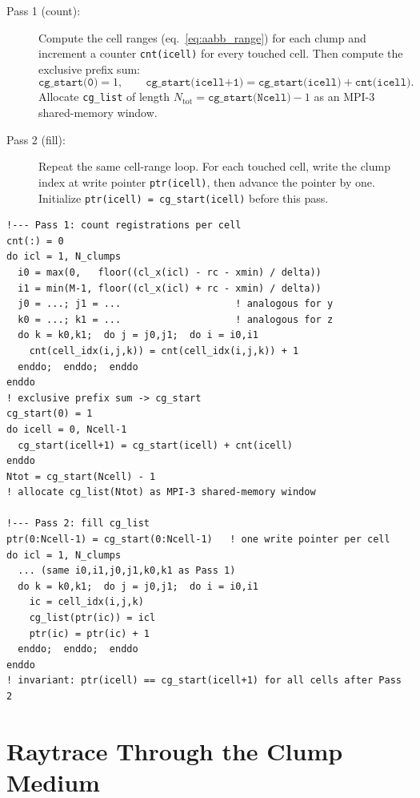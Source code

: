\documentclass[english,a4paper]{my_memo}
\begin{document}
\begin{sloppypar}
\begin{description}
  \item[Pass 1 (count):] Compute the cell ranges (eq.~\ref{eq:aabb_range})
  for each clump and increment a counter \texttt{cnt(icell)} for every
  touched cell.  Then compute the exclusive prefix sum:
  \[
    \texttt{cg\_start(0)} = 1, \qquad
    \texttt{cg\_start(icell+1)} = \texttt{cg\_start(icell)} + \texttt{cnt(icell)}.
  \]
  Allocate \texttt{cg\_list} of length
  $N_\mathrm{tot} = \texttt{cg\_start(Ncell)} - 1$ as an MPI-3
  shared-memory window.

  \item[Pass 2 (fill):] Repeat the same cell-range loop.  For each touched
  cell, write the clump index at write pointer \texttt{ptr(icell)}, then
  advance the pointer by one.  Initialize
  \texttt{ptr(icell) = cg\_start(icell)} before this pass.
\end{description}
\end{sloppypar}

\begin{lstlisting}
!--- Pass 1: count registrations per cell
cnt(:) = 0
do icl = 1, N_clumps
  i0 = max(0,   floor((cl_x(icl) - rc - xmin) / delta))
  i1 = min(M-1, floor((cl_x(icl) + rc - xmin) / delta))
  j0 = ...; j1 = ...                    ! analogous for y
  k0 = ...; k1 = ...                    ! analogous for z
  do k = k0,k1;  do j = j0,j1;  do i = i0,i1
    cnt(cell_idx(i,j,k)) = cnt(cell_idx(i,j,k)) + 1
  enddo;  enddo;  enddo
enddo
! exclusive prefix sum -> cg_start
cg_start(0) = 1
do icell = 0, Ncell-1
  cg_start(icell+1) = cg_start(icell) + cnt(icell)
enddo
Ntot = cg_start(Ncell) - 1
! allocate cg_list(Ntot) as MPI-3 shared-memory window

!--- Pass 2: fill cg_list
ptr(0:Ncell-1) = cg_start(0:Ncell-1)   ! one write pointer per cell
do icl = 1, N_clumps
  ... (same i0,i1,j0,j1,k0,k1 as Pass 1)
  do k = k0,k1;  do j = j0,j1;  do i = i0,i1
    ic = cell_idx(i,j,k)
    cg_list(ptr(ic)) = icl
    ptr(ic) = ptr(ic) + 1
  enddo;  enddo;  enddo
enddo
! invariant: ptr(icell) == cg_start(icell+1) for all cells after Pass 2
\end{lstlisting}

\section{Raytrace Through the Clump Medium}
\end{document}
